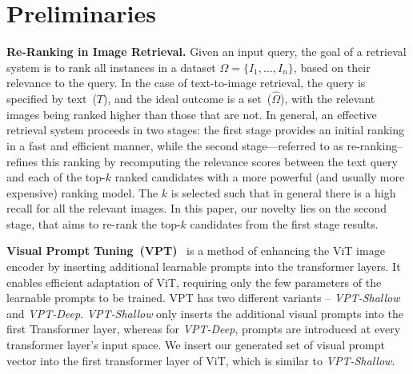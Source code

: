 \section{Preliminaries}
\label{sec:preliminary}


\noindent \textbf{Re-Ranking in Image Retrieval.} 
Given an input query, the goal of a retrieval system is to rank all instances in a dataset $\Omega = \{I_1, \dots, I_n \}$, based on their relevance to the query. 
In the case of text-to-image retrieval, the query is specified by text~($T$), and the ideal outcome is a set~($\hat{\Omega}$), with the relevant images being ranked higher than those that are not. In general, an effective retrieval system proceeds in two stages: the first stage provides an initial ranking in a fast and efficient manner, while the second stage—referred to as re-ranking--refines this ranking by recomputing the relevance scores between the text query and each of the top-$k$ ranked candidates with a more powerful (and usually more expensive) ranking model. 
The $k$ is selected such that in general there is a high recall for all the relevant images. In this paper, our novelty lies on the second stage, 
that aims to re-rank the top-$k$ candidates from the first stage results. 

\vspace{3pt}
\noindent \textbf{Visual Prompt Tuning~(VPT)}~\cite{jia2022visual} is a method of enhancing the ViT image encoder by inserting additional learnable prompts into the transformer layers. It enables efficient adaptation of ViT, requiring  only the few parameters of the learnable prompts to be trained. VPT has two different variants -- \emph{VPT-Shallow} and \emph{VPT-Deep}. \emph{VPT-Shallow} only inserts the additional visual prompts into the first Transformer layer, whereas for \emph{VPT-Deep}, prompts are introduced at every transformer layer's input space. We insert our generated set of visual prompt vector into the first transformer layer of ViT, which is similar to \emph{VPT-Shallow}.

